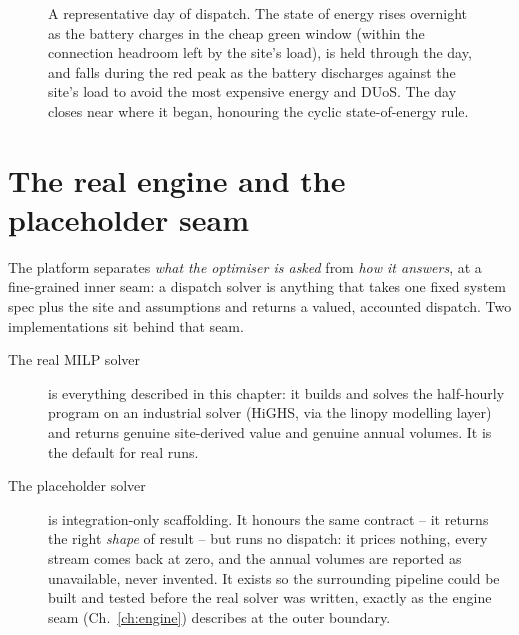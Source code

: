 \begin{figure}[H]
\centering
{}
\caption{A representative day of dispatch. The state of energy rises overnight as the battery charges in the cheap green window (within the connection headroom left by the site's load), is held through the day, and falls during the red peak as the battery discharges against the site's load to avoid the most expensive energy and DUoS. The day closes near where it began, honouring the cyclic state-of-energy rule.}
\label{fig:day}
\end{figure}

\section{The real engine and the placeholder seam}

The platform separates \emph{what the optimiser is asked} from \emph{how it answers}, at a fine-grained inner seam: a dispatch solver is anything that takes one fixed system spec plus the site and assumptions and returns a valued, accounted dispatch. Two implementations sit behind that seam.

\begin{description}
  \item[The real MILP solver] is everything described in this chapter: it builds and solves the half-hourly program on an industrial solver (HiGHS, via the linopy modelling layer) and returns genuine site-derived value and genuine annual volumes. It is the default for real runs.
  \item[The placeholder solver] is integration-only scaffolding. It honours the same contract -- it returns the right \emph{shape} of result -- but runs no dispatch: it prices nothing, every stream comes back at zero, and the annual volumes are reported as unavailable, never invented. It exists so the surrounding pipeline could be built and tested before the real solver was written, exactly as the engine seam (Ch.~\ref{ch:engine}) describes at the outer boundary.
\end{description}

